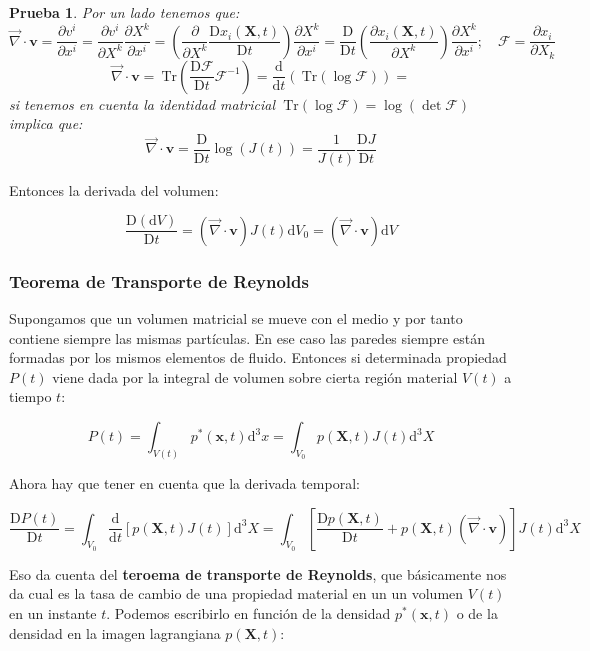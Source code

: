 \documentclass[12pt,a4paper]{article}
\numberwithin{equation}{section}
\numberwithin{figure}{section}
\newcommand{\parentesis}[1]{\left( #1  \right)}
\newcommand{\parciales}[2]{\frac{\partial #1}{\partial #2}}
\newcommand{\ccorchetes}[1]{\left[ #1  \right]}
\newcommand{\D}{\mathrm{d}}
\newcommand{\Dd}{\mathrm{D}}
\newcommand{\Tr}{\ \mathrm{Tr}}
\newcommand{\vn}{\mathbf{v}}
\newcommand{\xn}{\mathbf{x}}
\newcommand{\Xn}{\mathbf{X}}
\newtheorem{proff}{Prueba}[lemma]
\begin{document}
\begin{proff}
Por un lado tenemos que:
$$ \vec{\nabla} \cdot \vn = \parciales{v^i}{x^i} = \parciales{v^i}{X^k} \parciales{X^k}{x^i} = \parentesis{\parciales{}{X^k} \dfrac{\Dd x_i (\Xn,t)}{\Dd t}} \parciales{X^k}{x^i} = \dfrac{\Dd}{\Dd t} \parentesis{\parciales{x_i (\Xn,t)}{X^k}} \parciales{X^k}{x^i}; \quad \mathcal{F} = \parciales{x_i}{X_k} $$
$$ \vec{\nabla} \cdot \vn = \Tr \parentesis{\dfrac{\Dd \mathcal{F}}{\Dd t} \mathcal{F}^{-1}} = \dfrac{\D}{\D t} \parentesis{\Tr (\log \mathcal{F})} =  $$
si tenemos en cuenta la identidad matricial $\Tr (\log \mathcal{F}) = \log (\det \mathcal{F})$ implica que:
$$ \vec{\nabla} \cdot \vn = \dfrac{\Dd}{\Dd t} \log (J(t)) = \dfrac{1}{J(t)} \dfrac{\Dd J}{\Dd t} $$
\end{proff}
Entonces la derivada del volumen: 

\begin{equation}
\dfrac{\Dd (\D V)}{\Dd t} = (\vec{\nabla} \cdot \vn) J(t) \D V_0 =  (\vec{\nabla} \cdot \vn) \D V
\end{equation}

\subsubsection{Teorema de Transporte de Reynolds}

Supongamos que un volumen matricial se mueve con el medio y por tanto contiene siempre las mismas partículas. En ese caso las paredes siempre están formadas por los mismos elementos de fluido. Entonces si determinada propiedad $P(t)$ viene dada por la integral de volumen sobre cierta región material $V(t)$ a tiempo $t$:

\begin{equation}
P (t) = \int_{V(t)} p^* (\xn,t) \D^3 x = \int_{V_0} p (\Xn,t) J(t) \D^3 X
\end{equation} 

Ahora hay que tener en cuenta que la derivada temporal: 

$$ \dfrac{\Dd P(t)}{\Dd t} = \int_{V_0} \dfrac{\D}{\D t} \ccorchetes{p (\Xn,t) J(t)} \D^3 X  = \int_{V_0} \ccorchetes{\dfrac{\Dd p(\Xn,t)}{\Dd t} + p(\Xn,t) (\vec{\nabla} \cdot \vn) } J(t) \D^3 X  $$

Eso da cuenta del \textbf{teroema de transporte de Reynolds}, que básicamente nos da cual es la tasa de cambio de una propiedad material en un un volumen $V(t)$ en un instante $t$. Podemos escribirlo en función de la densidad $p^*(\xn,t)$ o de la densidad en la imagen lagrangiana $p(\Xn,t)$: 
\end{document}

